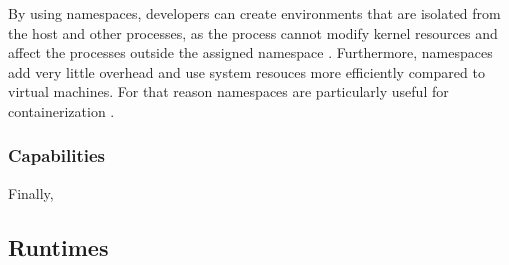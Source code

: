 By using namespaces, developers can create environments that are isolated from the host and other processes, as the process cannot modify kernel resources and affect the processes outside the assigned namespace \cite{d:dockersecurity}. Furthermore, namespaces add very little overhead and use system resouces more efficiently compared to virtual machines. For that reason namespaces are particularly useful for containerization \cite{c:1}.

\subsubsection{Capabilities}

Finally, 



\subsection{Runtimes}


